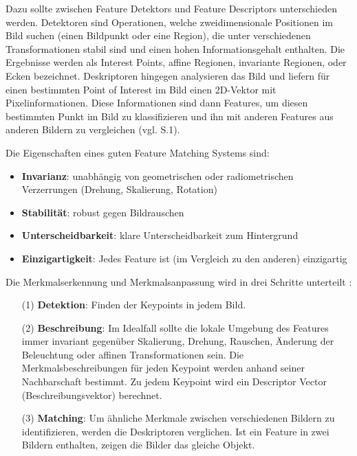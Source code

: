 Dazu sollte zwischen \glqq Feature Detektors\grqq{} und \glqq Feature Descriptors\grqq{} unterschieden werden. Detektoren sind Operationen, welche zweidimensionale Positionen im Bild suchen (einen Bildpunkt oder eine Region), die unter verschiedenen Transformationen stabil sind und einen hohen Informationsgehalt enthalten. Die Ergebnisse werden als \glqq Interest Points\grqq{}, affine Regionen, invariante Regionen, oder Ecken bezeichnet. Deskriptoren hingegen analysieren das Bild und liefern für einen bestimmten \glqq Point of Interest\grqq{} im Bild einen 2D-Vektor mit Pixelinformationen. Diese Informationen sind dann Features, um diesen bestimmten Punkt im Bild zu klassifizieren und ihn mit anderen Features aus anderen Bildern zu vergleichen (vgl. \cite{det_des} S.1).


Die Eigenschaften eines guten Feature Matching Systems sind: 

\begin{itemize}
\item \textbf{Invarianz}: unabhängig von geometrischen oder radiometrischen Verzerrungen (Drehung, Skalierung, Rotation)
\item \textbf{Stabilität}: robust gegen Bildrauschen
\item \textbf{Unterscheidbarkeit}: klare Unterscheidbarkeit zum Hintergrund
\item \textbf{Einzigartigkeit}: Jedes Feature ist (im Vergleich zu den anderen) einzigartig
\end{itemize}

Die Merkmalserkennung und Merkmalsanpassung wird in drei Schritte unterteilt \cite{robust_feature}: 

\begin{itemize}
\item[(1)] \textbf{Detektion}: Finden der Keypoints in jedem Bild.
\item[(2)] \textbf{Beschreibung}: Im Idealfall sollte die lokale Umgebung des Features immer invariant gegenüber Skalierung, Drehung, Rauschen, Änderung der Beleuchtung  oder affinen Transformationen sein. Die Merkmalsbeschreibungen für jeden Keypoint werden anhand seiner Nachbarschaft bestimmt. Zu jedem Keypoint wird ein \glqq Descriptor Vector\grqq{} (Beschreibungsvektor) berechnet.
\item[(3)] \textbf{Matching}: Um ähnliche Merkmale zwischen verschiedenen Bildern zu identifizieren, werden die Deskriptoren verglichen. Ist ein Feature in zwei Bildern enthalten, zeigen die Bilder das gleiche Objekt.
\end{itemize}


